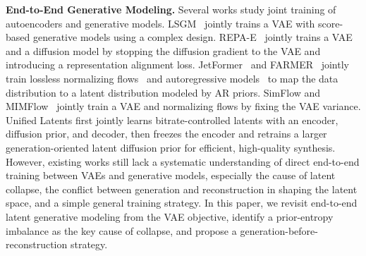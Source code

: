\documentclass[]{bytedance_seed}
\begin{document}
\textbf{End-to-End Generative Modeling.}
Several works study joint training of autoencoders and generative models. 
LSGM~\cite{lsgm} jointly trains a VAE with score-based generative models using a complex design. 
REPA-E~\cite{repa_e} jointly trains a VAE and a diffusion model by stopping the diffusion gradient to the VAE and introducing a representation alignment loss.
JetFormer~\cite{tschannen2024jetformer} and FARMER~\cite{zheng2025farmer} jointly train lossless normalizing flows~\cite{kolesnikov2024jet,tarflow} and autoregressive models~\cite{llamagen} to map the data distribution to a latent distribution modeled by AR priors. 
SimFlow and MIMFlow~\cite{simflow,chen2026mimflow} jointly train a VAE and normalizing flows by fixing the VAE variance. 
Unified Latents \cite{heek2026unified} first jointly learns bitrate-controlled latents with an encoder, diffusion prior, and decoder, then freezes the encoder and retrains a larger generation-oriented latent diffusion prior for efficient, high-quality synthesis.
However, existing works still lack a systematic understanding of direct end-to-end training between VAEs and generative models, especially the cause of latent collapse, the conflict between generation and reconstruction in shaping the latent space, and a simple general training strategy. 
In this paper, we revisit end-to-end latent generative modeling from the VAE objective, identify a prior-entropy imbalance as the key cause of collapse, and propose a generation-before-reconstruction strategy.
\end{document}
